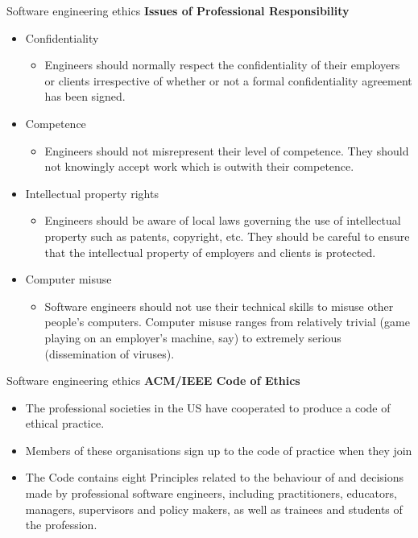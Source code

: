 \documentclass{beamer}
\begin{document}
\begin{frame}{Software engineering ethics}
	\textbf{Issues of Professional Responsibility}
	\begin{itemize}
		\item Confidentiality 
		\begin{itemize}
			\item Engineers should normally respect the confidentiality of their employers or clients irrespective of whether or not a formal confidentiality agreement has been signed.

		\end{itemize}
	  \item Competence 
	  \begin{itemize}
	  	\item Engineers should not misrepresent their level of competence. They should not 
	  	knowingly accept work which is outwith their competence.

	  \end{itemize}
  \item Intellectual property rights
  \begin{itemize}
  	\item Engineers should be aware of local laws governing the use of intellectual 
  	property such as patents, copyright, etc. They should be careful to ensure that 
  	the intellectual property of employers and clients is protected.

  \end{itemize}
\item Computer misuse
\begin{itemize}
	\item Software engineers should not use their technical skills to misuse other people’s 
	computers. Computer misuse ranges from relatively trivial (game playing on an 
	employer’s machine, say) to extremely serious (dissemination of viruses).
\end{itemize}
	\end{itemize}
\end{frame}
\begin{frame}{Software engineering ethics}
\textbf{ACM/IEEE Code of Ethics}
\begin{itemize}
	\item The professional societies in the US have cooperated to produce a code of ethical 
	practice.
	\item Members of these organisations sign up to the code of practice when they join
	\item The Code contains eight Principles related to the behaviour of and decisions made by professional software engineers, including practitioners, educators, managers, 
	supervisors and policy makers, as well as trainees and students of the profession. 
\end{itemize}
\end{frame}
\end{document}
